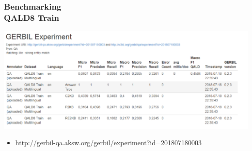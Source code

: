 \documentclass{beamer}
\begin{document}
\begin{frame}
\frametitle{Benchmarking \\ {\normalsize QALD8 Train}}
\begin{center}
	\includegraphics[scale=0.38]{QALD-8-Train.PNG}
\end{center}

\begin{itemize}
	\item  http://gerbil-qa.aksw.org/gerbil/experiment?id=201807180003
\end{itemize}
\end{frame}
\end{document}
